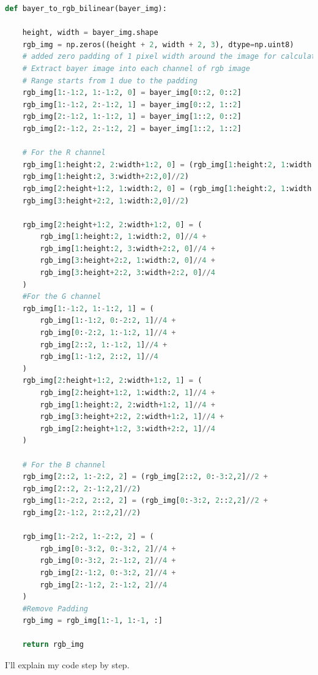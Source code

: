 \begin{lstlisting}[language=python]
def bayer_to_rgb_bilinear(bayer_img):
    
    height, width = bayer_img.shape
    rgb_img = np.zeros((height + 2, width + 2, 3), dtype=np.uint8)
    # added zero padding of 1 pixel width around the image for calculation efficiency    
    # Extract bayer image into each channel of rgb image
    # Range starts from 1 due to the padding
    rgb_img[1:-1:2, 1:-1:2, 0] = bayer_img[0::2, 0::2]    
    rgb_img[1:-1:2, 2:-1:2, 1] = bayer_img[0::2, 1::2]
    rgb_img[2:-1:2, 1:-1:2, 1] = bayer_img[1::2, 0::2]
    rgb_img[2:-1:2, 2:-1:2, 2] = bayer_img[1::2, 1::2]

    # For the R channel
    rgb_img[1:height:2, 2:width+1:2, 0] = (rgb_img[1:height:2, 1:width:2,0]//2 + 
    rgb_img[1:height:2, 3:width+2:2,0]//2) 
    rgb_img[2:height+1:2, 1:width:2, 0] = (rgb_img[1:height:2, 1:width:2,0]//2 + 
    rgb_img[3:height+2:2, 1:width:2,0]//2) 

    rgb_img[2:height+1:2, 2:width+1:2, 0] = (
        rgb_img[1:height:2, 1:width:2, 0]//4 + 
        rgb_img[1:height:2, 3:width+2:2, 0]//4 +
        rgb_img[3:height+2:2, 1:width:2, 0]//4 + 
        rgb_img[3:height+2:2, 3:width+2:2, 0]//4
    ) 
    #For the G channel
    rgb_img[1:-1:2, 1:-1:2, 1] = (
        rgb_img[1:-1:2, 0:-2:2, 1]//4 + 
        rgb_img[0:-2:2, 1:-1:2, 1]//4 +
        rgb_img[2::2, 1:-1:2, 1]//4 + 
        rgb_img[1:-1:2, 2::2, 1]//4
    )
    rgb_img[2:height+1:2, 2:width+1:2, 1] = (
        rgb_img[2:height+1:2, 1:width:2, 1]//4 + 
        rgb_img[1:height:2, 2:width+1:2, 1]//4 +
        rgb_img[3:height+2:2, 2:width+1:2, 1]//4 + 
        rgb_img[2:height+1:2, 3:width+2:2, 1]//4
    )

    # For the B channel
    rgb_img[2::2, 1:-2:2, 2] = (rgb_img[2::2, 0:-3:2,2]//2 +
    rgb_img[2::2, 2:-1:2,2]//2) 
    rgb_img[1:-2:2, 2::2, 2] = (rgb_img[0:-3:2, 2::2,2]//2 +
    rgb_img[2:-1:2, 2::2,2]//2) 
    
    rgb_img[1:-2:2, 1:-2:2, 2] = (
        rgb_img[0:-3:2, 0:-3:2, 2]//4 + 
        rgb_img[0:-3:2, 2:-1:2, 2]//4 +
        rgb_img[2:-1:2, 0:-3:2, 2]//4 + 
        rgb_img[2:-1:2, 2:-1:2, 2]//4
    )    
    #Remove Padding
    rgb_img = rgb_img[1:-1, 1:-1, :]
    
    return rgb_img
    \end{lstlisting}

I'll explain my code step by step. 


